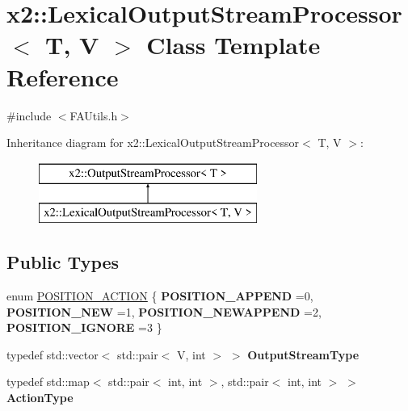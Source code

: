 \hypertarget{classx2_1_1_lexical_output_stream_processor}{}\section{x2\+:\+:Lexical\+Output\+Stream\+Processor$<$ T, V $>$ Class Template Reference}
\label{classx2_1_1_lexical_output_stream_processor}


{\ttfamily \#include $<$F\+A\+Utils.\+h$>$}

Inheritance diagram for x2\+:\+:Lexical\+Output\+Stream\+Processor$<$ T, V $>$\+:\begin{figure}[H]
\begin{center}
\leavevmode
\includegraphics[height=2.000000cm]{classx2_1_1_lexical_output_stream_processor}
\end{center}
\end{figure}
\subsection*{Public Types}
\begin{DoxyCompactItemize}
\item 
enum \hyperlink{classx2_1_1_lexical_output_stream_processor_a221c7064aea399ed949761e3e784acd7}{P\+O\+S\+I\+T\+I\+O\+N\+\_\+\+A\+C\+T\+I\+ON} \{ {\bfseries P\+O\+S\+I\+T\+I\+O\+N\+\_\+\+A\+P\+P\+E\+ND} =0, 
{\bfseries P\+O\+S\+I\+T\+I\+O\+N\+\_\+\+N\+EW} =1, 
{\bfseries P\+O\+S\+I\+T\+I\+O\+N\+\_\+\+N\+E\+W\+A\+P\+P\+E\+ND} =2, 
{\bfseries P\+O\+S\+I\+T\+I\+O\+N\+\_\+\+I\+G\+N\+O\+RE} =3
 \}
\item 
\mbox{\label{classx2_1_1_lexical_output_stream_processor_af5c4b994e1ac814f7c39d21e0caa8375}} 
typedef std\+::vector$<$ std\+::pair$<$ V, int $>$ $>$ {\bfseries Output\+Stream\+Type}
\item 
\mbox{\label{classx2_1_1_lexical_output_stream_processor_a9db9908c3ea85542720488129efc4245}} 
typedef std\+::map$<$ std\+::pair$<$ int, int $>$, std\+::pair$<$ int, int $>$ $>$ {\bfseries Action\+Type}
\end{DoxyCompactItemize}
